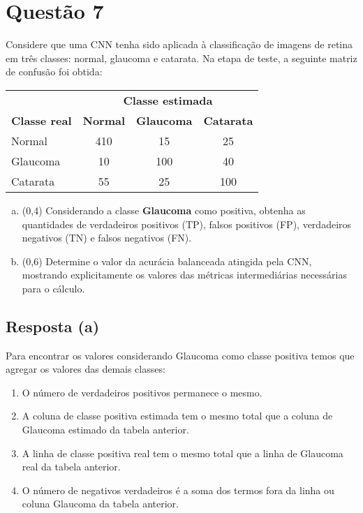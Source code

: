 \documentclass[final,3p]{elsarticle}
\numberwithin{equation}{section}
\begin{document}
\section{Questão 7}

    Considere que uma CNN tenha sido aplicada à classificação de imagens de retina em três classes: normal, glaucoma e catarata. Na etapa de teste, a seguinte matriz de confusão foi obtida:

    \begin{table}[H]
        \centering
        \begin{tabular}{l c c c}
            \toprule
             & \multicolumn{3}{c}{\textbf{Classe estimada}} \\
            \textbf{Classe real} & \textbf{Normal} & \textbf{Glaucoma} & \textbf{Catarata} \\
            \midrule
            Normal & 410 & 15 & 25 \\
            Glaucoma & 10 & 100 & 40 \\
            Catarata & 55 & 25 & 100 \\
            \bottomrule
        \end{tabular}
    \end{table}

    \begin{enumerate}[(a)]
        \item (0,4) Considerando a classe \textbf{Glaucoma} como positiva, obtenha as quantidades de verdadeiros positivos (TP), falsos positivos (FP), verdadeiros negativos (TN) e falsos negativos (FN).
        \item (0,6) Determine o valor da acurácia balanceada atingida pela CNN, mostrando explicitamente os valores das métricas intermediárias necessárias para o cálculo.
    \end{enumerate}

    \subsection{Resposta \textbf{(a)}}

        Para encontrar os valores considerando Glaucoma como classe positiva temos que agregar os valores das demais classes:

        \begin{enumerate}
            \item O número de verdadeiros positivos permanece o mesmo.
            \item A coluna de classe positiva estimada tem o mesmo total que a coluna de Glaucoma estimado da tabela anterior.
            \item A linha de classe positiva real tem o mesmo total que a linha de Glaucoma real da tabela anterior.
            \item O número de negativos verdadeiros é a soma dos termos fora da linha ou coluna Glaucoma da tabela anterior.
        \end{enumerate}
\end{document}
